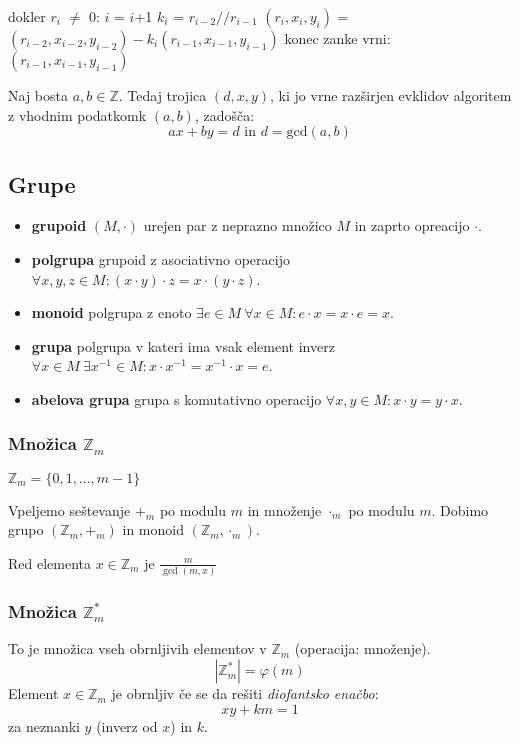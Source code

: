 \begin{multicols}{5}
\begin{koda}
dokler $r_i$ $\neq$ 0:
    $i$ = $i$+1
    $k_i$ = $r_{i-2} // r_{i-1}$
    $(r_i, x_i, y_i)$ = $(r_{i-2}, x_{i-2}, y_{i-2}) - k_i(r_{i-1}, x_{i-1}, y_{i-1})$
konec zanke
vrni: $(r_{i-1}, x_{i-1}, y_{i-1})$
\end{koda}

Naj bosta $a, b \in \mathbb{Z}$. Tedaj trojica $(d, x, y)$, ki jo vrne razširjen evklidov algoritem z vhodnim podatkomk $(a, b)$, zadošča:
\[ax + by = d \text{ in } d = \textrm{gcd}(a, b)\] 


\subsection*{Grupe}
\begin{itemize}
    \item \textbf{grupoid} $(M, \cdot)$ urejen par z neprazno množico $M$ in zaprto opreacijo $\cdot$.
    \item \textbf{polgrupa} grupoid z asociativno operacijo $ \forall x,y,z \in M : (x\cdot y)\cdot z = x\cdot (y\cdot z)$.
    \item \textbf{monoid} polgrupa z enoto $ \exists e \in M \ \forall x \in M : e\cdot x = x\cdot e = x$.
    \item \textbf{grupa} polgrupa v kateri ima vsak element inverz $ \forall x \in M \ \exists x^{-1} \in M : x\cdot x^{-1} = x^{-1}\cdot x = e$.
    \item \textbf{abelova grupa} grupa s komutativno operacijo $ \forall x,y \in M  : x\cdot y = y\cdot x$.
\end{itemize} 

\subsubsection{Množica $\mathbb{Z}_m$}
$\mathbb{Z}_m = \{0,1,...,m-1\}$

Vpeljemo seštevanje $+_m$ po modulu $m$ in množenje $\cdot_m$ po modulu $m$. 
Dobimo grupo $(\mathbb{Z}_m, +_m)$ in monoid $(\mathbb{Z}_m, \cdot_m)$.

Red elementa $x\in \mathbb{Z}_m$ je $\frac{m}{\gcd(m,x)}$

\subsubsection{Množica $\mathbb{Z}_m^*$}
To je množica vseh obrnljivih elementov v $\mathbb{Z}_m$ (operacija: množenje).
\[|\mathbb{Z}^*_m| = \varphi(m)\]
Element $x\in \mathbb{Z}_m$ je obrnljiv če se da rešiti \emph{diofantsko enačbo}:
\[ xy + km = 1\]
za neznanki $y$ (inverz od $x$) in $k$.


\end{multicols}
